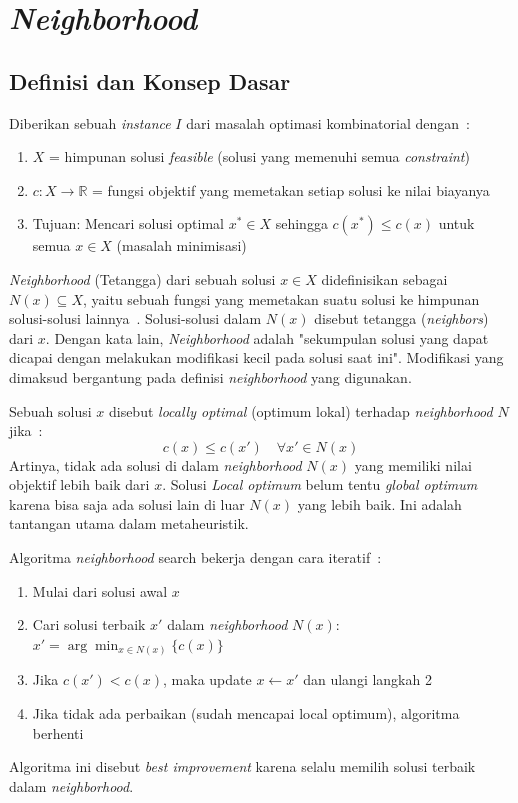 \documentclass{file/TA-ITS}
\theoremstyle{definition}
\theoremstyle{definition}
\theoremstyle{plain}
\begin{document}
\section{\textit{Neighborhood}}

\subsection{Definisi dan Konsep Dasar}
Diberikan sebuah \textit{instance} $I$ dari masalah optimasi kombinatorial dengan~\cite{pisinger2018lns}:
\begin{enumerate}
    \item $X$ = himpunan solusi \textit{feasible} (solusi yang memenuhi semua \textit{constraint})
    \item $c: X \to \mathbb{R}$ = fungsi objektif yang memetakan setiap solusi ke nilai biayanya
    \item Tujuan: Mencari solusi optimal $x^* \in X$ sehingga $c(x^*) \leq c(x)$ untuk semua $x \in X$ (masalah minimisasi)
\end{enumerate}

\textit{Neighborhood} (Tetangga) dari sebuah solusi $x \in X$ didefinisikan sebagai $N(x) \subseteq X$, yaitu sebuah fungsi yang memetakan suatu solusi ke himpunan solusi-solusi lainnya~\cite{pisinger2018lns}. Solusi-solusi dalam $N(x)$ disebut tetangga (\textit{neighbors}) dari $x$. Dengan kata lain, \textit{Neighborhood} adalah "sekumpulan solusi yang dapat dicapai dengan melakukan modifikasi kecil pada solusi saat ini". Modifikasi yang dimaksud bergantung pada definisi \textit{neighborhood} yang digunakan.

Sebuah solusi $x$ disebut \textit{locally optimal} (optimum lokal) terhadap \textit{neighborhood} $N$ jika~\cite{pisinger2018lns}:
\begin{equation}
c(x) \leq c(x') \quad \forall x' \in N(x)
\end{equation}
Artinya, tidak ada solusi di dalam \textit{neighborhood} $N(x)$ yang memiliki nilai objektif lebih baik dari $x$. Solusi \textit{Local optimum} belum tentu \textit{global optimum } karena bisa saja ada solusi lain di luar $N(x)$ yang lebih baik. Ini adalah tantangan utama dalam metaheuristik.

Algoritma \textit{neighborhood} search bekerja dengan cara iteratif~\cite{pisinger2018lns}:

\begin{enumerate}
    \item Mulai dari solusi awal $x$
    \item Cari solusi terbaik $x'$ dalam \textit{neighborhood} $N(x)$: \\
    $x' = \arg\min_{x \in N(x)} \{c(x)\}$
    \item Jika $c(x') < c(x)$, maka update $x \gets x'$ dan ulangi langkah 2
    \item Jika tidak ada perbaikan (sudah mencapai local optimum), algoritma berhenti
\end{enumerate}
Algoritma ini disebut \textit{best improvement} karena selalu memilih solusi terbaik dalam \textit{neighborhood}.
\end{document}
